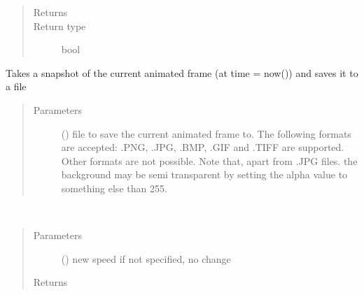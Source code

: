 \documentclass[letterpaper,10pt,english]{sphinxmanual}
\begin{document}
\begin{fulllineitems}
\begin{fulllineitems}
\begin{quote}
\begin{description}
\item[{Returns}] \leavevmode
{}

\item[{Return type}] \leavevmode
bool

\end{description}\end{quote}

\end{fulllineitems}


\begin{fulllineitems}
\label{\detokenize{Reference:salabim.Environment.snapshot}}
Takes a snapshot of the current animated frame (at time = now()) and saves it to a file
\begin{quote}\begin{description}
\item[{Parameters}] \leavevmode
{} () \textendash{} file to save the current animated frame to. 
The following formats are accepted: .PNG, .JPG, .BMP, .GIF and .TIFF are supported.
Other formats are not possible.
Note that, apart from .JPG files. the background may be semi transparent by setting
the alpha value to something else than 255.

\end{description}\end{quote}

\end{fulllineitems}


\begin{fulllineitems}
\label{\detokenize{Reference:salabim.Environment.speed}}~\begin{quote}\begin{description}
\item[{Parameters}] \leavevmode
{} () \textendash{} new speed 
if not specified, no change

\item[{Returns}] \leavevmode
{}


\end{description}
\end{quote}
\end{fulllineitems}
\end{fulllineitems}
\end{document}

